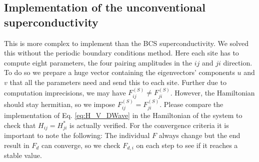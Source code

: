 \documentclass[../main.tex]{subfile}
\begin{document}
\subsection{Implementation of the unconventional superconductivity}
This is more complex to implement than the BCS superconductivity. We solved this without the periodic boundary conditions method.
Here each site has to compute eight parameters, the four pairing amplitudes in the $ij$ and $ji$ direction.
To do so we prepare a huge vector containing the eigenvectors' components $u$ and $v$ that all the parameters need and send this to each site.
Further due to computation imprecisions, we may have $F^{(S)}_{ij} \neq F^{(S)}_{ji}$. However, the Hamiltonian
should stay hermitian, so we impose $F^{(S)}_{ij} = F^{(S)}_{ji}$. Please compare the implementation of Eq. \ref{eq:H_V_DWave} in 
the Hamiltonian of the system to check that $H_{ij} = H_{ji}^{\ast}$ is
actually verified. For the convergence criteria it is important to note the following:
The individual $F$ always change but the end result in $F_d$ can converge, so we check $F_{d,i}$ on each step to see if it reaches a stable value.\\
\end{document}
